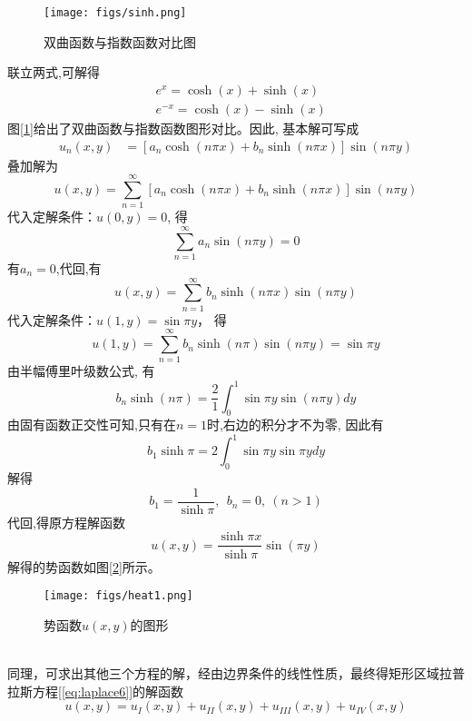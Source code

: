 \begin{figure}[htbp]
	\centering
	\texttt{[image: figs/sinh.png]}
	\caption{双曲函数与指数函数对比图}
	\label{fig:sinh}
\end{figure} 
联立两式,可解得
$$\displaystyle \begin{aligned}
	& e^x = \cosh(x) +\sinh(x) \\
	& e^{-x} =\cosh(x)-\sinh(x) 
\end{aligned}$$ 
图[\ref{fig:sinh}]给出了双曲函数与指数函数图形对比。因此, 基本解可写成
$$\displaystyle \begin{aligned}
	u_n(x,y)&= [a_n \cosh (n\pi x )+ b_n \sinh(n\pi x ) ]\sin (n \pi y)
\end{aligned}$$ 
叠加解为
\begin{equation*}
	u(x, y)   = \sum\limits_{n=1}^{\infty }  [a_n \cosh (n\pi x )+ b_n \sinh (n\pi x ) ] \sin (n \pi y)  
\end{equation*}	
代入定解条件：$ u(0,y)=0$, 得 
$$ \sum\limits_{n=1}^{\infty }  a_n  \sin (n \pi y) =0 $$ 
有$ a_n=0$,代回,有 
$$	u(x,y)    = \sum\limits_{n=1}^{\infty }  b_n \sinh (n\pi x )  \sin (n \pi y)  $$ 
代入定解条件：$u(1,y) = \sin \pi y $， 得
\begin{equation*}
	u(1,y) = \sum\limits_{n=1}^{\infty }  b_n \sinh (n\pi )  \sin (n \pi y)  = \sin \pi y
\end{equation*}
由半幅傅里叶级数公式, 有
\begin{equation*}
	b_n \sinh (n\pi ) = \frac{2}{1} \int_0^1 \sin \pi y \sin (n \pi y)dy
\end{equation*}
由固有函数正交性可知,只有在$n=1$时,右边的积分才不为零, 因此有
$$ b_1\sinh\pi =2 \int_0^1 \sin \pi y \sin \pi y dy$$	
解得 
$$ b_1 =\frac{1}{\sinh\pi}, ~~ b_n=0,~(n>1)$$
代回,得原方程解函数
\begin{equation*}
	u(x,y) = \dfrac{\sinh \pi x}{\sinh \pi}  \sin ( \pi y) 
\end{equation*}	
解得的势函数如图[\ref{fig:heat1}]所示。
\begin{figure}[htbp]
	\centering
	\texttt{[image: figs/heat1.png]}
	\caption{势函数$u(x,y)$的图形}
	\label{fig:heat1}
\end{figure}

~~\\ 
同理，可求出其他三个方程的解，经由边界条件的线性性质，最终得矩形区域拉普拉斯方程[\ref{eq:laplace6}]的解函数
\begin{equation*}
	u(x,y) = u_I (x,y)  +   u_{II}(x,y)  + u_{III}(x,y)  + u_{IV}(x,y)  
\end{equation*}	
~~\\ 

